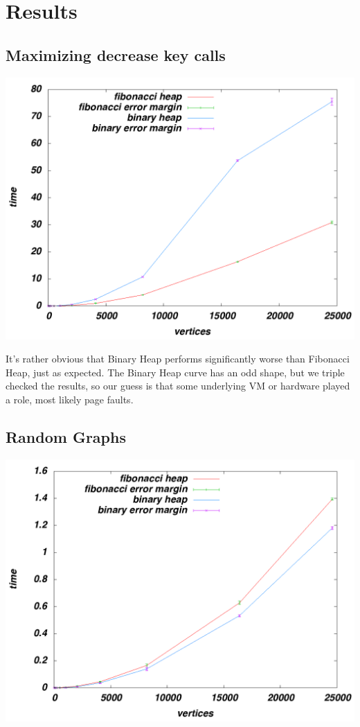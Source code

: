 \section*{Results}
\subsection*{Maximizing decrease key calls}
\includegraphics[scale=0.30]{../results/fibonacci-binary-dkmax2.png}
 
It's rather obvious that Binary Heap performs significantly worse than Fibonacci Heap, just as expected. The Binary Heap curve has an odd shape, but we triple checked the results, so our guess is that some underlying VM or hardware played a role, most likely page faults.
\subsection*{Random Graphs}
\includegraphics[scale=0.30]{../results/fibonacci-binary-random.png}

